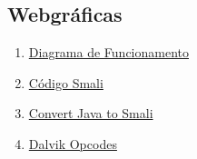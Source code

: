 \documentclass[hidelinks,12pt]{article}
\begin{document}
\subsection{Webgráficas}
\begin{enumerate}
	
	
	\item \href{http://www.javatpoint.com/dalvik-virtual-machine}{\color{blue}Diagrama de Funcionamento}
	
	\item \href{https://android.googlesource.com/platform/external/smali/+/jb-dev/examples/HelloWorld/HelloWorld.smali}{\color{blue}Código Smali}
	
	\item \href{http://stackoverflow.com/questions/29051781/convert-java-file-to-smali-file}{\color{blue}Convert Java to Smali}
	
	\item 
	\href{http://pallergabor.uw.hu/androidblog/dalvik\_opcodes.html}{\color{blue}Dalvik Opcodes}
	
\end{enumerate}
	
	
\end{document}
